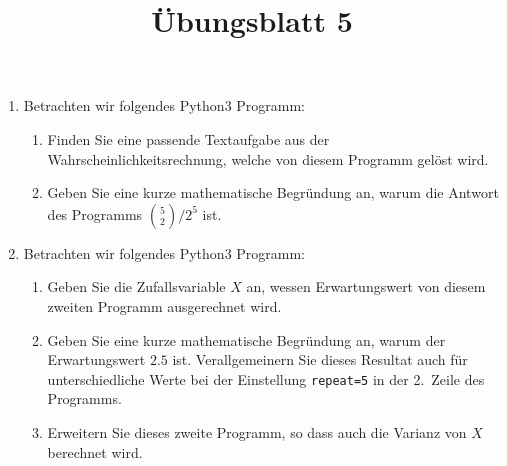 \documentclass{article}
\begin{document}
\title{Übungsblatt 5}
\date{}
\maketitle
{}
\makeatletter
\def\lst@outputspace{{\ifx\lst@bkgcolor\empty\color{white}\else\lst@bkgcolor\fi\lst@visiblespace}}
\makeatother
\thispagestyle{empty}
\begin{enumerate}
\item Betrachten wir folgendes Python3 Programm:


\begin{enumerate}
\item Finden Sie eine passende Textaufgabe aus der Wahrscheinlichkeits\-rechnung, welche
von diesem Programm gelöst wird.
\item Geben Sie eine kurze mathematische Begründung an, warum die Antwort des Programms $\binom{5}{2}/2^5$ ist.
\end{enumerate}

\item Betrachten wir folgendes Python3 Programm:


\begin{enumerate}
\item Geben Sie die Zufallsvariable $X$ an, wessen Erwartungswert von diesem zweiten Programm ausgerechnet wird.
\item Geben Sie eine kurze mathematische Begründung an, warum der Erwartungswert $2.5$ ist.
Verallgemeinern Sie dieses Resultat auch für unterschiedliche Werte bei der Einstellung
\texttt{repeat=5} in der 2.~Zeile des Programms.
\item Erweitern Sie dieses zweite Programm, so dass auch die Varianz von $X$ berechnet wird.
\end{enumerate}

\end{enumerate}
\end{document}
